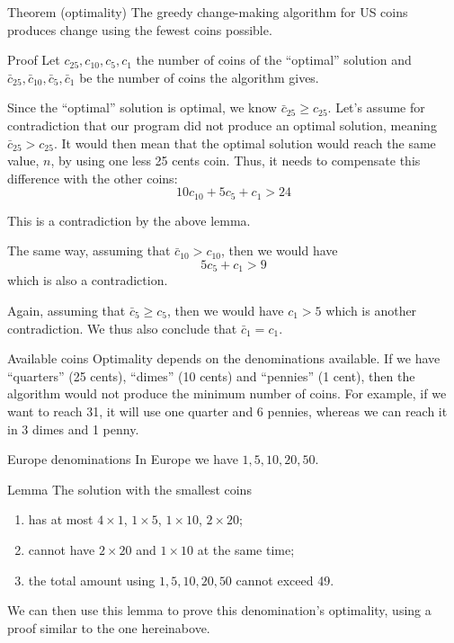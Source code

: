 \documentclass[a4paper]{article}
\begin{document}
\begin{parag}{Theorem (optimality)}
    The greedy change-making algorithm for US coins produces change using the fewest coins possible.

    \begin{subparag}{Proof}
        Let $c_{25}, c_{10}, c_5, c_1$ the number of coins of the ``optimal'' solution and $\bar{c}_{25}, \bar{c}_{10}, \bar{c}_5, \bar{c}_1$ be the number of coins the algorithm gives.

        Since the ``optimal'' solution is optimal, we know $\bar{c}_{25} \geq c_{25}$. Let's assume for contradiction that our program did not produce an optimal solution, meaning $\bar{c}_{25} > c_{25}$. It would then mean that the optimal solution would reach the same value, $n$, by using one less 25 cents coin. Thus, it needs to compensate this difference with the other coins:
        \[10 c_{10} + 5c_5 + c_1 > 24\]

        This is a contradiction by the above lemma.

        The same way, assuming that $\bar{c}_{10} > c_{10}$, then we would have
        \[5c_5 + c_1 > 9\]
        which is also a contradiction.

        Again, assuming that $\bar{c}_5 \geq c_5$, then we would have $c_1 > 5$ which is another contradiction. We thus also conclude that $\bar{c}_1 = c_1$.
    \end{subparag}

\end{parag}

\begin{parag}{Available coins}
    Optimality depends on the denominations available. If we have ``quarters'' (25 cents), ``dimes'' (10 cents) and ``pennies'' (1 cent), then the algorithm would not produce the minimum number of coins. For example, if we want to reach 31, it will use one quarter and 6 pennies, whereas we can reach it in 3 dimes and 1 penny.
\end{parag}

\begin{parag}{Europe denominations}
    In Europe we have $1, 5, 10, 20, 50$.

    \begin{subparag}{Lemma}
        The solution with the smallest coins
        \begin{enumerate}
            \item has at most $4\times1$, $1\times5$, $1\times10$, $2\times20$;
            \item cannot have $2\times20$ and $1\times10$ at the same time;
            \item the total amount using $1, 5, 10, 20, 50$ cannot exceed 49.
        \end{enumerate}
    \end{subparag}

    We can then use this lemma to prove this denomination's optimality, using a proof similar to the one hereinabove.
\end{parag}
\end{document}
